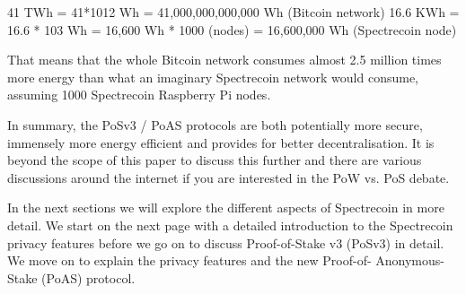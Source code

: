  

41 TWh = 41*1012 Wh = 41,000,000,000,000 Wh (Bitcoin network) 16.6 KWh = 16.6 * 103 Wh = 16,600 Wh * 1000 (nodes) = 16,600,000 Wh (Spectrecoin node) 

 

That means that the whole Bitcoin network consumes almost 2.5 million times more energy than what an imaginary Spectrecoin network would consume, assuming 1000 Spectrecoin Raspberry Pi nodes. 

 


In summary, the PoSv3 / PoAS protocols are both potentially more secure, immensely more energy efficient and provides for better decentralisation. It is beyond the scope of this paper to discuss this further and there are various discussions around the internet if you are interested in the PoW vs. PoS debate. 

 

In the next sections we will explore the different aspects of Spectrecoin in more detail. We start on the next page with a detailed introduction to the Spectrecoin privacy features before we go on to discuss Proof-of-Stake v3 (PoSv3) in detail. We move on to explain the privacy features and the new Proof-of-
Anonymous-Stake (PoAS) protocol.